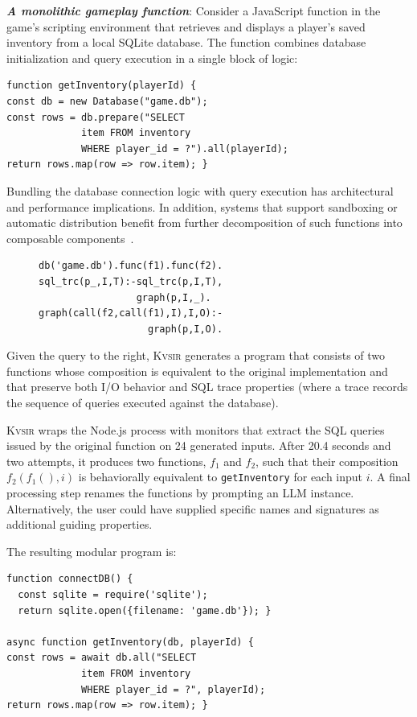 \documentclass[sigplan,review,anonymous,10pt]{acmart}
\newcommand{\sys}{{\scshape Kv{\textalpha}sir}\xspace}
\newcommand{\heading}[1]{\vspace{2pt}\noindent\textbf{\emph{#1}}:\enspace}
\begin{document}
\heading{A monolithic gameplay function}
Consider a JavaScript function in the game's scripting environment that
retrieves and displays a player's saved inventory from a local SQLite database.
The function combines database initialization and query execution in a single
block of logic:

\begin{verbatim}
function getInventory(playerId) {
const db = new Database("game.db");
const rows = db.prepare("SELECT
             item FROM inventory
             WHERE player_id = ?").all(playerId);
return rows.map(row => row.item); }
\end{verbatim}

Bundling the database connection logic with query execution has architectural
and performance implications. In addition, systems that support sandboxing or
automatic distribution benefit from further decomposition of such functions
into composable components~\cite{Towards_Modern_Ghemaw_2023, vasilakis2019ignis, vasilakis2018breakapp}.

\begin{figure}
  \begin{verbatim}
db('game.db').func(f1).func(f2).
sql_trc(p_,I,T):-sql_trc(p,I,T),
                 graph(p,I,_).
graph(call(f2,call(f1),I),I,O):-
                   graph(p,I,O).
  \end{verbatim}
\end{figure}

Given the query to the right, \sys generates a program that consists of two
functions whose composition is equivalent to the original implementation and
that preserve both I/O behavior and SQL trace properties (where a trace records
the sequence of queries executed against the database).

\sys wraps the Node.js process with monitors that extract the SQL queries
issued by the original function on 24 generated inputs.
After 20.4 seconds and
two attempts, it produces two functions, $f_1$ and $f_2$, such that their
composition $f_2(f_1(), i)$ is behaviorally equivalent to \texttt{getInventory}
for each input $i$.
A final processing step renames the functions by prompting
an LLM instance.
Alternatively, the user could have supplied specific names and
signatures as additional guiding properties.

The resulting modular program is:
\begin{verbatim}
function connectDB() {
  const sqlite = require('sqlite');
  return sqlite.open({filename: 'game.db'}); }

async function getInventory(db, playerId) {
const rows = await db.all("SELECT 
             item FROM inventory
             WHERE player_id = ?", playerId);
return rows.map(row => row.item); }
\end{verbatim}
\end{document}
